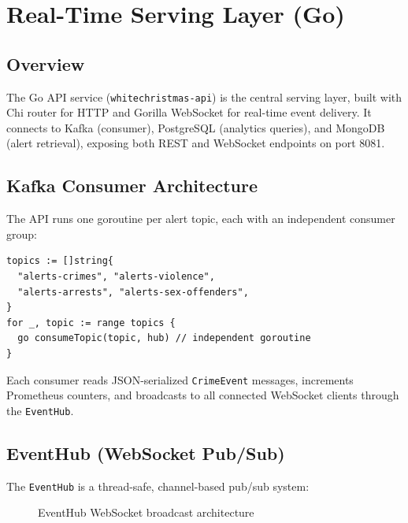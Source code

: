 \documentclass[12pt,a4paper]{article}
\begin{document}
\section{Real-Time Serving Layer (Go)}

\subsection{Overview}

The Go API service (\texttt{whitechristmas-api}) is the central serving layer, built with Chi router for HTTP and Gorilla WebSocket for real-time event delivery. It connects to Kafka (consumer), PostgreSQL (analytics queries), and MongoDB (alert retrieval), exposing both REST and WebSocket endpoints on port 8081.

\subsection{Kafka Consumer Architecture}

The API runs one goroutine per alert topic, each with an independent consumer group:

\begin{lstlisting}[caption={Multi-topic Kafka consumer initialization}]
topics := []string{
  "alerts-crimes", "alerts-violence",
  "alerts-arrests", "alerts-sex-offenders",
}
for _, topic := range topics {
  go consumeTopic(topic, hub) // independent goroutine
}
\end{lstlisting}

Each consumer reads JSON-serialized \texttt{CrimeEvent} messages, increments Prometheus counters, and broadcasts to all connected WebSocket clients through the \texttt{EventHub}.

\subsection{EventHub (WebSocket Pub/Sub)}

The \texttt{EventHub} is a thread-safe, channel-based pub/sub system:

\begin{figure}[H]
\centering
{}
\caption{EventHub WebSocket broadcast architecture}
\end{figure}
\end{document}
